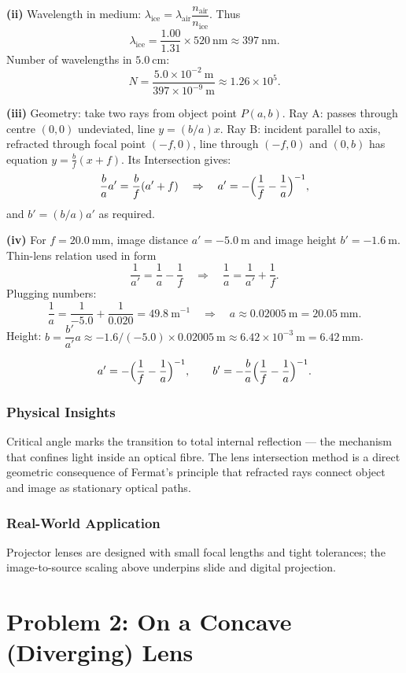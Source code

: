\documentclass[12pt,a4paper]{article}
\newcommand{\bluebox}[1]{\begin{tcolorbox}#1\end{tcolorbox}}
\newcommand{\n}{\ensuremath{n}}
\newcommand{\air}{\text{air}}
\newcommand{\ice}{\text{ice}}
\begin{document}
\textbf{(ii)} Wavelength in medium: $\lambda_{\ice}=\lambda_{\air}\dfrac{\n_{\air}}{\n_{\ice}}$. Thus
\[
\lambda_{\ice}=\frac{1.00}{1.31}\times 520\ \mathrm{nm}\approx 397\ \mathrm{nm}.
\]
Number of wavelengths in $5.0\ \mathrm{cm}$:
\[
N=\frac{5.0\times10^{-2}\ \mathrm{m}}{397\times10^{-9}\ \mathrm{m}}\approx 1.26\times10^{5}.
\]

\textbf{(iii)} Geometry: take two rays from object point $P(a,b)$. Ray A: passes through centre $(0,0)$ undeviated, line $y=(b/a)x$. Ray B: incident parallel to axis, refracted through focal point $(-f,0)$, line through $( -f,0)$ and $(0,b)$ has equation $y=\frac{b}{f}(x+f)$. Its Intersection gives:
\[
\frac{b}{a}a'=\frac{b}{f}(a'+f)\quad\Rightarrow\quad a'=-\Bigl(\frac{1}{f}-\frac{1}{a}\Bigr)^{-1},
\]
and $b'=(b/a)a'$ as required.

\textbf{(iv)} For $f=20.0\ \mathrm{mm}$, image distance $a'=-5.0\ \mathrm{m}$ and image height $b'=-1.6\ \mathrm{m}$. Thin-lens relation used in form
\[
\frac{1}{a'}=\frac{1}{a}-\frac{1}{f}\quad\Rightarrow\quad \frac{1}{a}=\frac{1}{a'}+\frac{1}{f}.
\]
Plugging numbers:
\[
\frac{1}{a}=\frac{1}{-5.0}+\frac{1}{0.020}=49.8\ \mathrm{m^{-1}}\quad\Rightarrow\quad a\approx 0.02005\ \mathrm{m}=20.05\ \mathrm{mm}.
\]
Height: $b = \dfrac{b'}{a'}a\approx -1.6/(-5.0)\times 0.02005\ \mathrm{m}\approx 6.42\times10^{-3}\ \mathrm{m}=6.42\ \mathrm{mm}$.

\bluebox{\[
a'=-\Bigl(\frac{1}{f}-\frac{1}{a}\Bigr)^{-1},\qquad b'=-\frac{b}{a}\Bigl(\frac{1}{f}-\frac{1}{a}\Bigr)^{-1}.
\]}

\subsubsection*{Physical Insights}
Critical angle marks the transition to total internal reflection — the mechanism that confines light inside an optical fibre. The lens intersection method is a direct geometric consequence of Fermat's principle that refracted rays connect object and image as stationary optical paths.

\subsubsection*{Real-World Application}
Projector lenses are designed with small focal lengths and tight tolerances; the image-to-source scaling above underpins slide and digital projection.



\section{Problem 2: On a Concave (Diverging) Lens}
\end{document}
